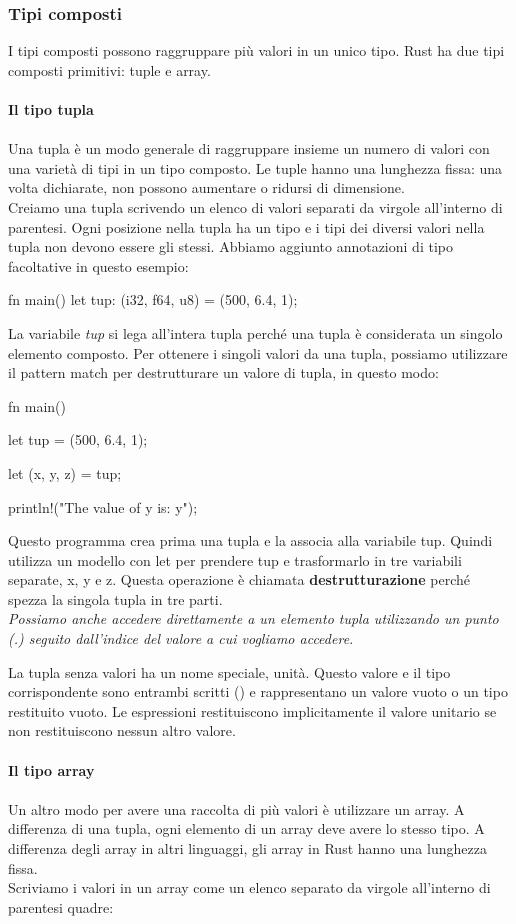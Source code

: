 \documentclass[11pt,a4paper]{article}
\begin{document}
\subsubsection{Tipi composti}

I tipi composti possono raggruppare più valori in un unico tipo. Rust ha due tipi composti primitivi: tuple e array.\\
\\
\textbf{Il tipo tupla}\\
\\
Una tupla è un modo generale di raggruppare insieme un numero di valori con una varietà di tipi in un tipo composto. Le tuple hanno una lunghezza fissa: una volta dichiarate, non possono aumentare o ridursi di dimensione.\\
Creiamo una tupla scrivendo un elenco di valori separati da virgole all'interno di parentesi. Ogni posizione nella tupla ha un tipo e i tipi dei diversi valori nella tupla non devono essere gli stessi. Abbiamo aggiunto annotazioni di tipo facoltative in questo esempio:
\begin{rust}
fn main() {
    let tup: (i32, f64, u8) = (500, 6.4, 1);
}
\end{rust}
La variabile \textit{tup} si lega all'intera tupla perché una tupla è considerata un singolo elemento composto. Per ottenere i singoli valori da una tupla, possiamo utilizzare il pattern match per destrutturare un valore di tupla, in questo modo:
\begin{rust}
fn main() {
    let tup = (500, 6.4, 1);

    let (x, y, z) = tup;

    println!("The value of y is: {y}");
}
\end{rust}
Questo programma crea prima una tupla e la associa alla variabile tup. Quindi utilizza un modello con let per prendere tup e trasformarlo in tre variabili separate, x, y e z. Questa operazione è chiamata \textbf{destrutturazione} perché spezza la singola tupla in tre parti.\\

\textit{Possiamo anche accedere direttamente a un elemento tupla utilizzando un punto (.) seguito dall'indice del valore a cui vogliamo accedere.}

La tupla senza valori ha un nome speciale, unità. Questo valore e il tipo corrispondente sono entrambi scritti () e rappresentano un valore vuoto o un tipo restituito vuoto. Le espressioni restituiscono implicitamente il valore unitario se non restituiscono nessun altro valore.\\
\\
\textbf{Il tipo array}\\
\\
Un altro modo per avere una raccolta di più valori è utilizzare un array. A differenza di una tupla, ogni elemento di un array deve avere lo stesso tipo. A differenza degli array in altri linguaggi, gli array in Rust hanno una lunghezza fissa.\\
Scriviamo i valori in un array come un elenco separato da virgole all'interno di parentesi quadre:
\end{document}
